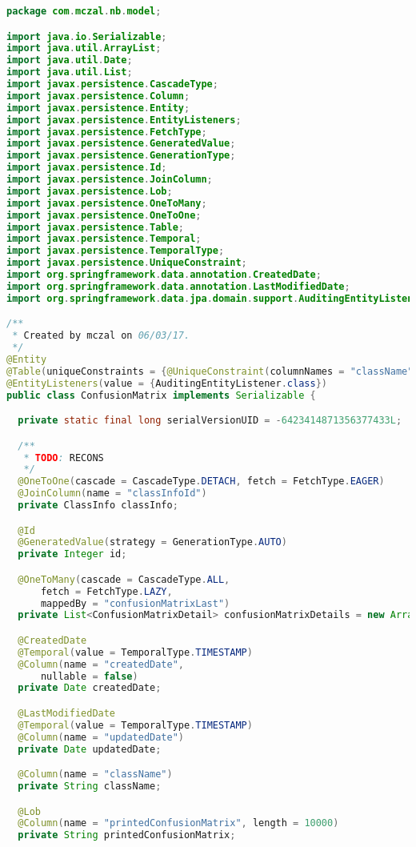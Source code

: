 \begin{lstlisting}[language=Java,basicstyle=\tiny,caption=ConfusionMatrix.java]
package com.mczal.nb.model;

import java.io.Serializable;
import java.util.ArrayList;
import java.util.Date;
import java.util.List;
import javax.persistence.CascadeType;
import javax.persistence.Column;
import javax.persistence.Entity;
import javax.persistence.EntityListeners;
import javax.persistence.FetchType;
import javax.persistence.GeneratedValue;
import javax.persistence.GenerationType;
import javax.persistence.Id;
import javax.persistence.JoinColumn;
import javax.persistence.Lob;
import javax.persistence.OneToMany;
import javax.persistence.OneToOne;
import javax.persistence.Table;
import javax.persistence.Temporal;
import javax.persistence.TemporalType;
import javax.persistence.UniqueConstraint;
import org.springframework.data.annotation.CreatedDate;
import org.springframework.data.annotation.LastModifiedDate;
import org.springframework.data.jpa.domain.support.AuditingEntityListener;

/**
 * Created by mczal on 06/03/17.
 */
@Entity
@Table(uniqueConstraints = {@UniqueConstraint(columnNames = "className")})
@EntityListeners(value = {AuditingEntityListener.class})
public class ConfusionMatrix implements Serializable {

  private static final long serialVersionUID = -6423414871356377433L;

  /**
   * TODO: RECONS
   */
  @OneToOne(cascade = CascadeType.DETACH, fetch = FetchType.EAGER)
  @JoinColumn(name = "classInfoId")
  private ClassInfo classInfo;

  @Id
  @GeneratedValue(strategy = GenerationType.AUTO)
  private Integer id;

  @OneToMany(cascade = CascadeType.ALL,
      fetch = FetchType.LAZY,
      mappedBy = "confusionMatrixLast")
  private List<ConfusionMatrixDetail> confusionMatrixDetails = new ArrayList<ConfusionMatrixDetail>();

  @CreatedDate
  @Temporal(value = TemporalType.TIMESTAMP)
  @Column(name = "createdDate",
      nullable = false)
  private Date createdDate;

  @LastModifiedDate
  @Temporal(value = TemporalType.TIMESTAMP)
  @Column(name = "updatedDate")
  private Date updatedDate;

  @Column(name = "className")
  private String className;

  @Lob
  @Column(name = "printedConfusionMatrix", length = 10000)
  private String printedConfusionMatrix;


\end{lstlisting}
